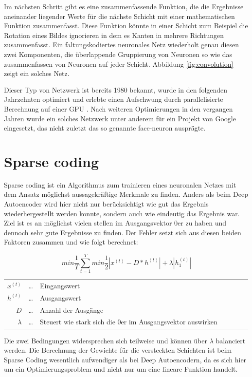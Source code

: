 Im nächsten Schritt gibt es eine zusammenfassende Funktion, die die Ergebnisse aneinander liegender Werte für die nächste Schicht mit einer mathematischen Funktion zusammenfasst. Diese Funktion könnte in einer Schicht zum Beispiel die Rotation eines Bildes ignorieren in dem es Kanten in mehrere Richtungen zusammenfasst. Ein faltungskodiertes neuronales Netz wiederholt genau diesen zwei Komponenten, die überlappende Gruppierung von Neuronen so wie das zusammenfassen von Neuronen auf jeder Schicht. Abbildung \ref{fig:convolution} zeigt ein solches Netz.

Dieser Typ von Netzwerk ist bereits 1980  bekannt, wurde in den folgenden Jahrzehnten optimiert und erlebte einen Aufschwung durch parallelisierte Berechnung auf einer GPU . Nach weiteren Optimierungen in den vergangen Jahren wurde ein solches Netzwerk unter anderem für ein Projekt von Google  eingesetzt, das nicht zuletzt das so genannte face-neuron ausprägte.

\section{Sparse coding}

Sparse coding ist ein Algorithmus zum trainieren eines neuronalen Netzes mit dem Ansatz möglichst aussagekräftige Merkmale zu finden. Anders als beim Deep Autoencoder wird hier nicht nur berücksichtigt wie gut das Ergebnis wiederhergestellt werden konnte, sondern auch wie eindeutig das Ergebnis war. Ziel ist es an möglichst vielen stellen im Ausgangsvektor 0er zu haben und dennoch sehr gute Ergebnisse zu finden. Der Fehler setzt sich aus diesen beiden Faktoren zusammen und wie folgt berechnet:

$$min\frac{1}{T}\sum_{t=1}^{T}min\frac{1}{2}|x^{(t)}-D*h^{(t)}|+\lambda|h^{(t)}_1|$$
\begin{center}\begin{tabular}{rclcrcl}
	$x^{(t)}$ & \dots & Eingangswert\\
	$h^{(t)}$ & \dots & Ausgangswert\\
	$D$ & \dots & Anzahl der Ausgänge\\
	$\lambda$ & \dots & Steuert wie stark sich die 0er im Ausgangsvektor auswirken\\ 
\end{tabular}\end{center}

Die zwei Bedingungen widersprechen sich teilweise und können über $\lambda$ balanciert werden. Die Berechnung der Gewichte für die versteckten Schichten ist beim Sparse Coding wesentlich aufwendiger als bei Deep Autoencodern, da es sich hier um ein Optimierungsproblem und nicht nur um eine lineare Funktion handelt.